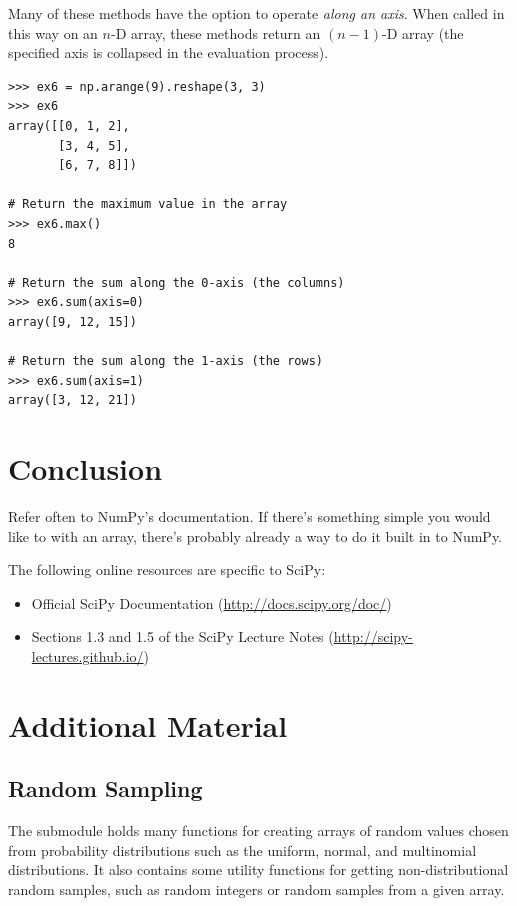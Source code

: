 Many of these methods have the option to operate \emph{along an axis}. 
When called in this way on an $n$-D array, these methods return an $(n-1)$-D array (the specified axis is collapsed in the evaluation process).

\begin{lstlisting}
>>> ex6 = np.arange(9).reshape(3, 3)
>>> ex6
array([[0, 1, 2],
       [3, 4, 5],
       [6, 7, 8]])
       
# Return the maximum value in the array
>>> ex6.max() 
8

# Return the sum along the 0-axis (the columns)
>>> ex6.sum(axis=0)
array([9, 12, 15])

# Return the sum along the 1-axis (the rows)
>>> ex6.sum(axis=1)
array([3, 12, 21])
\end{lstlisting}




\section*{Conclusion} %

Refer often to NumPy's documentation.
If there's something simple you would like to with an array, there's probably already a way to do it built in to NumPy.

The following online resources are specific to SciPy:
\begin{itemize}
\item Official SciPy Documentation (\url{http://docs.scipy.org/doc/})
\item Sections 1.3 and 1.5 of the SciPy Lecture Notes (\url{http://scipy-lectures.github.io/})
\end{itemize}

\newpage

\section*{Additional Material} %

\subsection*{Random Sampling} %

The submodule  holds many functions for creating arrays of random values chosen from probability distributions such as the uniform, normal, and multinomial distributions.
It also contains some utility functions for getting non-distributional random samples, such as random integers or random samples from a given array.


